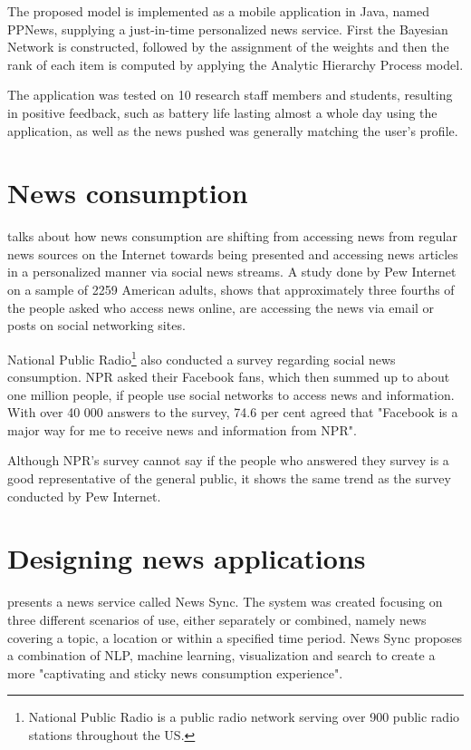 The proposed model is implemented as a mobile application in Java, named PPNews, supplying a just-in-time personalized news service. First the Bayesian Network is constructed, followed by the assignment of the weights and then the rank of each item is computed by applying the Analytic Hierarchy Process model.

The application was tested on 10 research staff members and students, resulting in positive feedback, such as battery life lasting almost a whole day using the application, as well as the news pushed was generally matching the user's profile.

\section{News consumption}
\cite{mashable2010newsconsumption} talks about how news consumption are shifting from accessing news from regular news sources on the Internet towards being presented and accessing news articles in a personalized manner via social news streams. A study done by Pew Internet on a sample of 2259 American adults, shows that approximately three fourths of the people asked who access news online, are accessing the news via email or posts on social networking sites\cite{purcell2010understanding}.

National Public Radio\footnote{National Public Radio is a public radio network serving over 900 public radio stations throughout the US.} also conducted a survey regarding social news consumption\cite{npr2010facebooksurvery}. NPR asked their Facebook fans, which then summed up to about one million people, if people use social networks to access news and information. With over 40 000 answers to the survey, 74.6 per cent agreed that "Facebook is a major way for me to receive news and information from NPR".

Although NPR's survey cannot say if the people who answered they survey is a good representative of the general public, it shows the same trend as the survey conducted by Pew Internet.

\section{Designing news applications}

\cite{vinod2010news} presents a news service called News Sync. The system was created focusing on three different scenarios of use, either separately or combined, namely news covering a topic, a location or within a specified time period. News Sync proposes a combination of NLP, machine learning, visualization and search to create a more "captivating and sticky news consumption experience".

